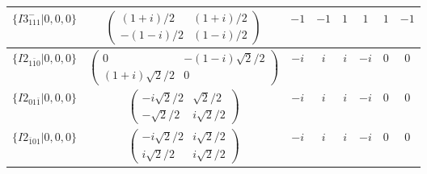 \documentclass[3p,preprint]{elsarticle}
\begin{document}
\begin{table}[H]
\begin{tabular}{|l|c||c|c|c|c|c|c|}
		$\{I3^{-}_{111}|0,0,0\}$ &		$\left(\begin{array}{cc} (1+i)/2&(1+i)/2 \\ -(1-i)/2&(1-i)/2 \end{array}\right)$	&$-1$ & $-1$ & $1$ & $1$ & $1$ & $-1$ \\ \hline
		$\{I2_{1\bar{1}0}|0,0,0\}$ &	$\left(\begin{array}{cc} 0&-(1-i)\sqrt{2}/2 \\ (1+i)\sqrt{2}/2&0 \end{array}\right)$	&$-i$ & $i$ & $i$ & $-i$ & $0$ & $0$ \\ \hline
		$\{I2_{01\bar{1}}|0,0,0\}$ &	$\left(\begin{array}{cc} -i\sqrt{2}/2&\sqrt{2}/2 \\ -\sqrt{2}/2&i\sqrt{2}/2 \end{array}\right)$	&$-i$ & $i$ & $i$ & $-i$  & $0$ & $0$ \\ \hline
		$\{I2_{\bar{1}01}|0,0,0\}$ &	$\left(\begin{array}{cc} -i\sqrt{2}/2&i\sqrt{2}/2 \\ i\sqrt{2}/2&i\sqrt{2}/2 \end{array}\right)$	&$-i$ & $i$ & $i$ & $-i$  & $0$ & $0$ \\ \hline
	\end{tabular}
\end{table}
\end{document}
